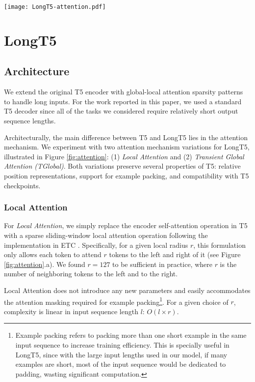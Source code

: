 \documentclass[11pt]{article}
\begin{document}
\begin{figure*}[t!]
	\texttt{[image: LongT5-attention.pdf]}
	\centering
	\caption{Illustration of the two attention mechanisms we experimented with in LongT5.}
	\label{fig:attention}
\end{figure*}


\section{LongT5}\label{sec:longt5}
\subsection{Architecture}
We extend the original T5 encoder with global-local attention sparsity patterns~\cite{etc,bigbird} to handle long inputs. For the work reported in this paper, we used a standard T5 decoder since all of the tasks we considered require relatively short output sequence lengths.

Architecturally, the main difference between T5 and LongT5 lies in the attention mechanism. We experiment with two attention mechanism variations for LongT5, illustrated in Figure \ref{fig:attention}: (1) \emph{Local Attention} and (2) \emph{Transient Global Attention (TGlobal)}.  Both variations preserve several properties of T5: relative position representations, support for example packing, and compatibility with T5 checkpoints.



\subsubsection{Local Attention}
For {\em Local Attention}, we simply replace the encoder self-attention operation in T5 with a sparse sliding-window local attention operation following the implementation in ETC \cite{etc}.  Specifically, for a given local radius $r$, this formulation only allows each token to attend $r$ tokens to the left and right of it (see Figure \ref{fig:attention}.a).  We found $r = 127$ to be sufficient in practice, where $r$ is the number of neighboring tokens to the left and to the right. 

Local Attention does not introduce any new parameters and easily accommodates the attention masking required for example packing\footnote{Example packing refers to packing more than one short example in the same input sequence to increase training efficiency. This is specially useful in LongT5, since with the large input lengths used in our model, if many examples are short, most of the input sequence would be dedicated to padding, wasting significant computation.}. For a given choice of $r$, complexity is linear in input sequence length $l$: $O(l \times r)$.
\end{document}
